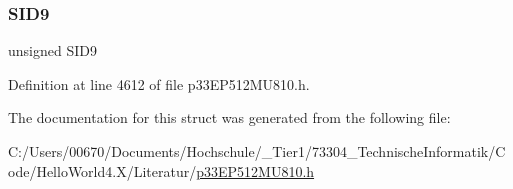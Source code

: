 \subsubsection{\texorpdfstring{S\+I\+D9}{SID9}}
{\footnotesize\ttfamily unsigned S\+I\+D9}



Definition at line 4612 of file p33\+E\+P512\+M\+U810.\+h.



The documentation for this struct was generated from the following file\+:\begin{DoxyCompactItemize}
\item 
C\+:/\+Users/00670/\+Documents/\+Hochschule/\+\_\+\+Tier1/73304\+\_\+\+Technische\+Informatik/\+Code/\+Hello\+World4.\+X/\+Literatur/\hyperlink{p33_e_p512_m_u810_8h}{p33\+E\+P512\+M\+U810.\+h}\end{DoxyCompactItemize}
